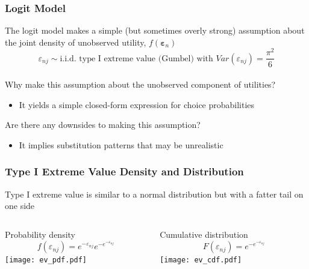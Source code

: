 \documentclass{beamer}
\begin{document}
\begin{frame}\frametitle{Logit Model}
    The logit model makes a simple (but sometimes overly strong) assumption about the joint density of unobserved utility, $f(\bm{\varepsilon}_n)$
    $$\varepsilon_{nj} \sim \text{i.i.d.\ type I extreme value (Gumbel) with } Var(\varepsilon_{nj}) = \frac{\pi^2}{6}$$ \\
    \vspace{3ex}
    Why make this assumption about the unobserved component of utilities?
    \begin{itemize}
    	\item It yields a simple closed-form expression for choice probabilities
    \end{itemize}
    \vspace{3ex}
    Are there any downsides to making this assumption?
    \begin{itemize}
    	\item It implies substitution patterns that may be unrealistic
    \end{itemize}
\end{frame}

\begin{frame}\frametitle{Type I Extreme Value Density and Distribution}
    Type I extreme value is similar to a normal distribution but with a fatter tail on one side \\
    \begin{columns}
		\begin{column}{0.5\textwidth}
			\begin{center}
				Probability density
				$$f(\varepsilon_{nj}) = e^{-\varepsilon_{nj}} e^{-e^{-\varepsilon_{nj}}}$$
				\texttt{[image: ev\_pdf.pdf]}      
			\end{center}
		\end{column}
		\begin{column}{0.5\textwidth}
    		\begin{center}
     			Cumulative distribution 
     			$$F(\varepsilon_{nj}) = e^{-e^{-\varepsilon_{nj}}}$$
				\texttt{[image: ev\_cdf.pdf]}          
     		\end{center}
		\end{column}
	\end{columns}
\end{frame}
\end{document}
